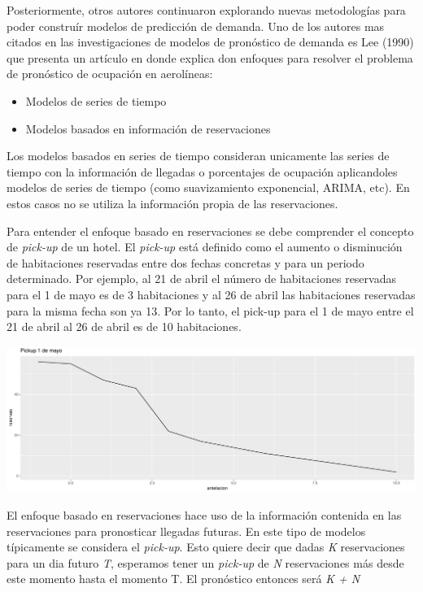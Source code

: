 {Posteriormente, otros autores continuaron explorando nuevas metodologías para poder construír modelos de predicción de demanda. Uno de los autores mas citados en las investigaciones de modelos de pronóstico de demanda es Lee (1990) que presenta un artículo en donde explica don enfoques para resolver el problema de pronóstico de ocupación en aerolíneas:
\begin{itemize}
  \item Modelos de series de tiempo 
  \item Modelos basados en información de reservaciones
\end{itemize}

Los modelos basados en series de tiempo consideran unicamente las series de tiempo con la información de llegadas o porcentajes de ocupación aplicandoles modelos de series de tiempo (como suavizamiento exponencial, ARIMA, etc). En estos casos no se utiliza la información propia de las reservaciones.


Para entender el enfoque basado en reservaciones se debe comprender el concepto de \emph{pick-up} de un hotel. El \emph{pick-up} está definido como el aumento o disminución de habitaciones reservadas entre dos fechas concretas y para un periodo determinado. Por ejemplo, al 21 de abril el número de habitaciones reservadas para el 1 de mayo es de 3 habitaciones y al 26 de abril las habitaciones reservadas para la misma fecha son ya 13.  Por lo tanto, el pick-up para el 1 de mayo entre el 21 de abril al 26 de abril es de 10 habitaciones.

\includegraphics[width=\maxwidth]{figures/pickupEjemplo.pdf} 

El enfoque basado en reservaciones hace uso de la información contenida en las reservaciones para pronosticar llegadas futuras. En este tipo de modelos típicamente se considera el \emph{pick-up}. Esto quiere decir que dadas \emph{K} reservaciones para un dia futuro \emph{T}, esperamos tener un \emph{pick-up} de \emph{N} reservaciones más desde este momento hasta el momento T. El pronóstico entonces será \emph{K + N}

}
